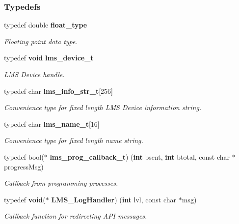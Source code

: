 \subsubsection*{Typedefs}
\begin{DoxyCompactItemize}
\item 
typedef double {\bf float\+\_\+type}
\begin{DoxyCompactList}\small\item\em Floating point data type. \end{DoxyCompactList}\item 
typedef {\bf void} {\bf lms\+\_\+device\+\_\+t}
\begin{DoxyCompactList}\small\item\em L\+MS Device handle. \end{DoxyCompactList}\item 
typedef char {\bf lms\+\_\+info\+\_\+str\+\_\+t}[256]
\begin{DoxyCompactList}\small\item\em Convenience type for fixed length L\+MS Device information string. \end{DoxyCompactList}\item 
typedef char {\bf lms\+\_\+name\+\_\+t}[16]
\begin{DoxyCompactList}\small\item\em Convenience type for fixed length name string. \end{DoxyCompactList}\item 
typedef bool($\ast$ {\bf lms\+\_\+prog\+\_\+callback\+\_\+t}) ({\bf int} bsent, {\bf int} btotal, const char $\ast$progress\+Msg)
\begin{DoxyCompactList}\small\item\em Callback from programming processes. \end{DoxyCompactList}\item 
typedef {\bf void}($\ast$ {\bf L\+M\+S\+\_\+\+Log\+Handler}) ({\bf int} lvl, const char $\ast$msg)
\begin{DoxyCompactList}\small\item\em Callback function for redirecting A\+PI messages. \end{DoxyCompactList}\end{DoxyCompactItemize}
